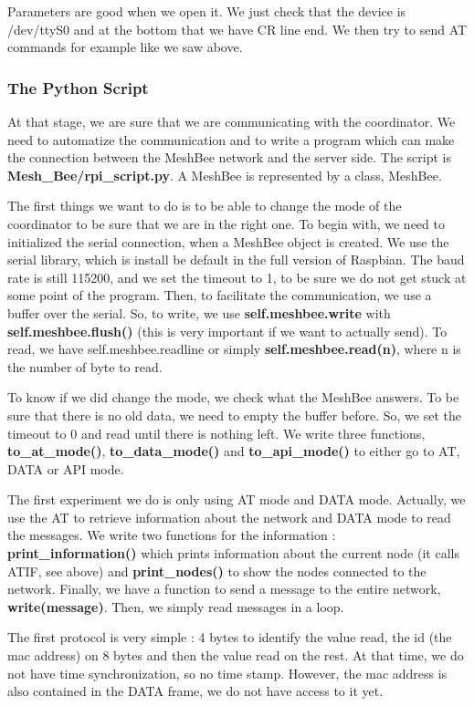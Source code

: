 Parameters are good when we open it. We just check that the device is /dev/ttyS0 and at the bottom that we have CR line end. We then try to send AT commands for example like we saw above.

\subsubsection{The Python Script}

At that stage, we are sure that we are communicating with the coordinator. We need to automatize the communication and to write a program which can make the connection between the MeshBee network and the server side. The script is \textbf{Mesh\_Bee/rpi\_script.py}. A MeshBee is represented by a class, MeshBee.

The first things we want to do is to be able to change the mode of the coordinator to be sure that we are in the right one. To begin with, we need to initialized the serial connection, when a MeshBee object is created. We use the serial library, which is install be default in the full version of Raspbian. The baud rate is still 115200, and we set the timeout to 1, to be sure we do not get stuck at some point of the program. Then, to facilitate the communication, we use a buffer over the serial. So, to write, we use \textbf{self.meshbee.write} with \textbf{self.meshbee.flush()} (this is very important if we want to actually send). To read, we have self.meshbee.readline or simply \textbf{self.meshbee.read(n)}, where n is the number of byte to read.

To know if we did change the mode, we check what the MeshBee answers. To be sure that there is no old data, we need to empty the buffer before. So, we set the timeout to 0 and read until there is nothing left. We write three functions,\textbf{ to\_at\_mode()}, \textbf{to\_data\_mode()} and \textbf{to\_api\_mode()} to either go to AT, DATA or API mode.

The first experiment we do is only using AT mode and DATA mode. Actually, we use the AT to retrieve information about the network and DATA mode to read the messages. We write two functions for the information : \textbf{print\_information()} which prints information about the current node (it calls ATIF, see above) and \textbf{print\_nodes()} to show the nodes connected to the network. Finally, we have a function to send a message to the entire network, \textbf{write(message)}. Then, we simply read messages in a loop.

The first protocol is very simple : 4 bytes to identify the value read, the id (the mac address) on 8 bytes and then the value read on the rest. At that time, we do not have time synchronization, so no time stamp. However, the mac address is also contained in the DATA frame, we do not have access to it yet.


